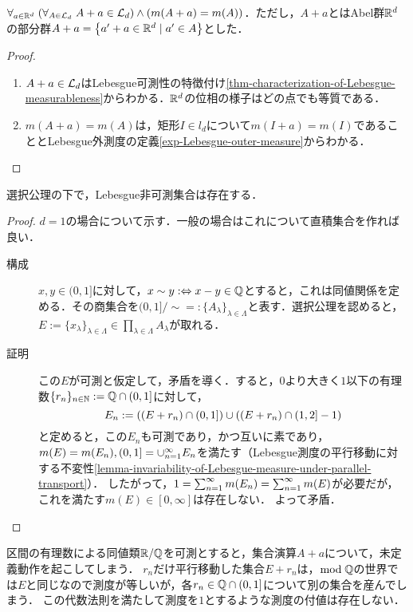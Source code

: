 \documentclass[uplatex, dvipdfmx]{jsreport}
\begin{document}
\begin{lemma}[Lebesgue測度の平行移動不変性]\label{lemma-invariability-of-Lebesgue-measure-under-parallel-transport}
    $\forall_{a\in\mathbb{R}^d}\;(\forall_{A\in\mathcal{L}_d}\;A+a\in\mathcal{L}_d)\land(m(A+a)=m(A))$．ただし，$A+a$とはAbel群$\mathbb{R}^d$の部分群$A+a=\left\{a'+a\in\mathbb{R}^d\mid a'\in A\right\}$とした．
\end{lemma}
\begin{proof}\mbox{}
    \begin{enumerate}
        \item $A+a\in\mathcal{L}_d$はLebesgue可測性の特徴付け\ref{thm-characterization-of-Lebesgue-measurableness}からわかる．$\mathbb{R}^d$の位相の様子はどの点でも等質である．
        \item $m(A+a)=m(A)$は，矩形$I\in l_d$について$m(I+a)=m(I)$であることとLebesgue外測度の定義\ref{exp-Lebesgue-outer-measure}からわかる．
    \end{enumerate}
\end{proof}

\begin{theorem}[Lebesgue非可測集合]\label{thm-existence-of-unmeasurable-sets}
    選択公理の下で，Lebesgue非可測集合は存在する．
\end{theorem}
\begin{proof}
    $d=1$の場合について示す．一般の場合はこれについて直積集合を作れば良い．
    \begin{description}
        \item[構成] 
        $x,y\in(0,1]$に対して，$x\sim y:\Leftrightarrow x-y\in\mathbb{Q}$とすると，これは同値関係を定める．その商集合を$(0,1]/\sim=:\{A_\lambda\}_{\lambda\in\Lambda}$と表す．選択公理を認めると，$E:=\{x_\lambda\}_{\lambda\in\Lambda}\in\prod_{\lambda\in\Lambda}A_\lambda$が取れる．
        \item[証明]
        この$E$が可測と仮定して，矛盾を導く．すると，$0$より大きく$1$以下の有理数$\{r_n\}_{n\in\mathbb{N}}:=\mathbb{Q}\cap(0,1]$に対して，
        \[E_n:=\left((E+r_n)\cap(0,1]\right)\cup\left((E+r_n)\cap(1,2]-1\right)\]
        と定めると，この$E_n$も可測であり，かつ互いに素であり，$m(E)=m(E_n),(0,1]=\cup_{n=1}^\infty E_n$を満たす（Lebesgue測度の平行移動に対する不変性\ref{lemma-invariability-of-Lebesgue-measure-under-parallel-transport}）．
        したがって，$1=\sum_{n=1}^\infty m(E_n)=\sum_{n=1}^\infty m(E)$が必要だが，これを満たす$m(E)\in[0,\infty]$は存在しない．
        よって矛盾．
    \end{description}
\end{proof}
\begin{remarks}
    区間の有理数による同値類$\mathbb{R}/\mathbb{Q}$を可測とすると，集合演算$A+a$について，未定義動作を起こしてしまう．
    $r_n$だけ平行移動した集合$E+r_n$は，$\mathrm{mod}\;\mathbb{Q}$の世界では$E$と同じなので測度が等しいが，各$r_n\in\mathbb{Q}\cap(0,1]$について別の集合を産んでしまう．
    この代数法則を満たして測度を$1$とするような測度の付値は存在しない．
\end{remarks}
\end{document}

